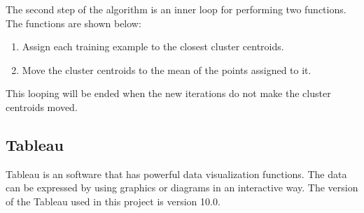 The second step of the algorithm is an inner loop for performing two functions. The functions are shown below:
\begin{enumerate}
\item Assign each training example to the closest cluster centroids.
\item Move the cluster centroids to the mean of the points assigned to it.
\end{enumerate} 

This looping will be ended when the new iterations do not make the cluster centroids moved.

\subsection{Tableau}
Tableau is an software that has powerful data visualization functions. The data can be expressed by using graphics or diagrams in an interactive way. The version of the Tableau used in this project is version 10.0.